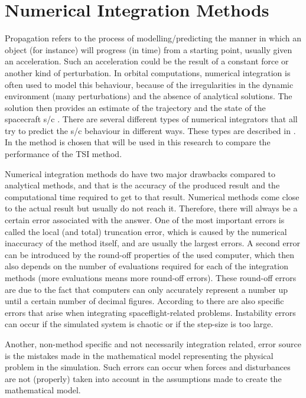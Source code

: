 \chapter{Numerical Integration Methods}

\label{ch:standardIntegrationMethods}
Propagation refers to the process of modelling/predicting the manner in which an object (for instance) will progress (in time) from a starting point, usually given an acceleration. Such an acceleration could be the result of a constant force or another kind of perturbation. In orbital computations, numerical integration is often used to model this behaviour, because of the irregularities in the dynamic environment (many perturbations) and the absence of analytical solutions. The solution then provides an estimate of the trajectory and the state of the spacecraft \acs{s/c} \citep{hofsteenge2013}. There are several different types of numerical integrators that all try to predict the \ac{s/c} behaviour in different ways. These types are described in . In  the method is chosen that will be used in this research to compare the performance of the \ac{TSI} method. 

Numerical integration methods do have two major drawbacks compared to analytical methods, and that is the accuracy of the produced result and the computational time required to get to that result. Numerical methods come close to the actual result but usually do not reach it. Therefore, there will always be a certain error associated with the answer. One of the most important errors is called the local (and total) truncation error, which is caused by the numerical inaccuracy of the method itself, and are usually the largest errors. A second error can be introduced by the round-off properties of the used computer, which then also depends on the number of evaluations required for each of the integration methods (more evaluations means more round-off errors). These round-off errors are due to the fact that computers can only accurately represent a number up until a certain number of decimal figures. According to \cite{milani1987} there are also specific errors that arise when integrating spaceflight-related problems. Instability errors can occur if the simulated system is chaotic or if the step-size is too large.

Another, non-method specific and not necessarily integration related, error source is the mistakes made in the mathematical model representing the physical problem in the simulation. Such errors can occur when forces and disturbances are not (properly) taken into account in the assumptions made to create the mathematical model.

